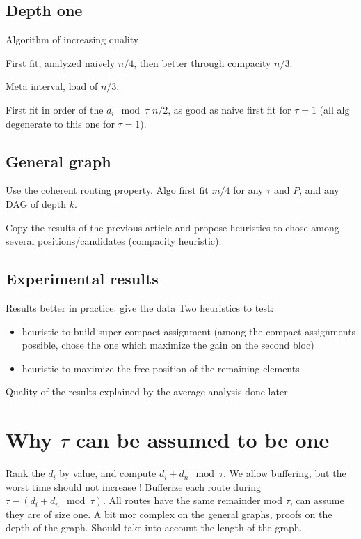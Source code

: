 \documentclass[10pt, conference, letterpaper]{IEEEtran}
\begin{document}
\subsection{Depth one}

Algorithm of increasing quality

First fit, analyzed naively $n/4$, then better through compacity $n/3$.

Meta interval, load of $n/3$.

First fit in order of the $d_i \mod \tau$ $n/2$, as good as naive first fit for 
$\tau = 1$ (all alg degenerate to this one for $\tau =1$).

\subsection{General graph}

Use the coherent routing property.
Algo first fit :$n/4$ for any $\tau$ and $P$, and any DAG of depth $k$. 

Copy the results of the previous article and propose heuristics to chose among several positions/candidates (compacity heuristic).

\subsection{Experimental results}

Results better in practice: give the data
Two heuristics to test:
\begin{itemize}
	\item  heuristic to build super compact assignment (among the compact assignments
possible, chose the one which maximize the gain on the second bloc)
	\item heuristic to maximize the free position of the remaining elements
\end{itemize}

Quality of the results explained by the average analysis done later
 

\section{Why $\tau$ can be assumed to be one}

Rank the $d_i$ by value, and compute $d_i + d_n \mod \tau$.
We allow buffering, but the worst time should not increase !
Bufferize  each route during $\tau - (d_i + d_n \mod \tau)$.
All routes have the same remainder mod $\tau$, can assume they are of 
size one.
A bit mor complex on the general graphs, proofs on the depth of the graph. 
Should take into account the length of the graph.
\end{document}

